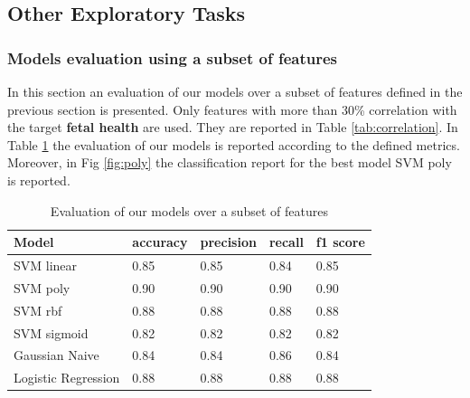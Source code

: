 \documentclass[a4paper,12pt]{article}
\begin{document}
\subsection{Other Exploratory Tasks}

\subsubsection{Models evaluation using a subset of features}

In this section an evaluation of our models over a subset of features defined in the previous section is presented. Only features with more than 30\% correlation with the target \textbf{fetal health} are used. They are reported in Table \ref{tab:correlation}. In Table \ref{tab:subset} the evaluation of our models is reported according to the defined metrics. Moreover, in Fig \ref{fig:poly} the classification report for the best model SVM poly is reported.

\begin{table}[H]
\begin{tabular}{ |p{6cm}||p{2cm}|p{2cm}|p{2cm}|p{2cm}| }
  \hline
  Model& accuracy & precision  &  recall & f1 score \\
  \hline
  SVM linear &          0.85&   0.85&  0.84&  0.85\\
  SVM poly   &          0.90&   0.90&  0.90&  0.90\\
  SVM rbf    &          0.88&   0.88&  0.88&  0.88\\
  SVM sigmoid &         0.82&   0.82&  0.82&  0.82\\
  Gaussian Naive &         0.84&   0.84&  0.86&  0.84\\
  Logistic Regression&  0.88&   0.88&  0.88&  0.88\\
  \hline
\end{tabular}
\caption{Evaluation of our models over a subset of features}
\label{tab:subset}
\end{table}
\end{document}
